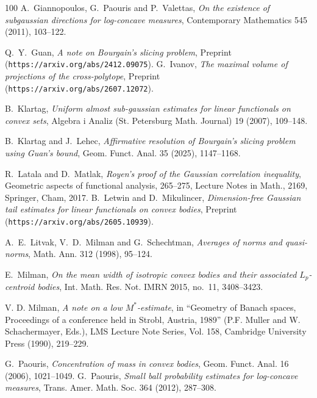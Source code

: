 \documentclass[11pt,leqno]{article}
\theoremstyle{definition}
\numberwithin{equation}{section}
\begin{document}
\begin{thebibliography}{100}
 \textrm{A.\ Giannopoulos, G.\ Paouris and P.\ Valettas}, \textit{On the existence of subgaussian directions for log-concave
measures}, Contemporary Mathematics {545} (2011), 103--122.

 \textrm{Q.~Y.~Guan}, \textit{A note on Bourgain's slicing problem},
Preprint ({\tt https://arxiv.org/abs/2412.09075}).
 \textrm{G.~Ivanov}, \textit{The maximal volume of projections of the cross-polytope},
Preprint\\ ({\tt https://arxiv.org/abs/2607.12072}).

 \textrm{B.\ Klartag}, \textit{Uniform almost sub-gaussian estimates for linear functionals on convex sets},
Algebra i Analiz (St. Petersburg Math. Journal) {19} (2007), 109--148.

 \textrm{B.~Klartag and J.~Lehec}, \textit{Affirmative resolution of Bourgain's slicing problem using
Guan's bound}, Geom. Funct. Anal. 35 (2025), 1147--1168.

 \textrm{R.\ Latala and D.\ Matlak}, \textit{Royen's proof of the Gaussian correlation inequality},
Geometric aspects of functional analysis, 265--275, Lecture Notes in Math., 2169, Springer, Cham, 2017.
 \textrm{B.~Letwin and D.~Mikulincer}, \textit{Dimension-free Gaussian tail estimates for linear functionals on convex bodies},
Preprint ({\tt https://arxiv.org/abs/2605.10939}).

 \textrm{A.\ E.\ Litvak, V.\ D.\ Milman and G.\ Schechtman},
\textit{Averages of norms and quasi-norms}, Math. Ann. {312} (1998), 95--124.

 \textrm{E.\ Milman}, \textit{On the mean width of isotropic convex bodies and
their associated $L_p$-centroid bodies},  Int. Math. Res. Not. IMRN 2015, no.~11, 3408--3423.

 \textrm{V. D. Milman}, \textit{A note on a low $M^{\ast }$-estimate}, in ``Geometry of Banach spaces,
Proceedings of a conference held in Strobl, Austria, 1989'' (P.F. Muller and W. Schachermayer, Eds.),
LMS Lecture Note Series, Vol. 158, Cambridge University Press (1990), 219--229.

 \textrm{G.\ Paouris}, \textit{Concentration of mass in convex bodies},
Geom. Funct. Anal.  16 (2006), 1021--1049.
 \textrm{G.\ Paouris}, \textit{Small ball probability estimates for log-concave measures},
Trans. Amer. Math. Soc. {364} (2012), 287--308.


\end{thebibliography}
\end{document}
